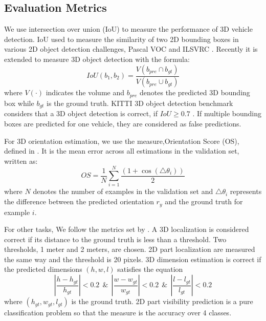 \subsection{Evaluation Metrics}

We use intersection over union (IoU) to measure the performance of 3D vehicle detection. IoU used to measure the similarity of two 2D bounding boxes in various 2D object detection challenges, \eg Pascal VOC \cite{Everingham15} and ILSVRC \cite{DBLP:Russakovsky14}. Recently it is extended to measure 3D object detection with the formula:
\begin{equation}
	IoU(b_1, b_2) = \frac{V(b_{pre}\cap b_{gt})}{V(b_{pre}\cup b_{gt})}
\end{equation}
where $V(\cdot)$ indicates the volume and $b_{pre}$ denotes the predicted 3D bounding box while $b_{gt}$ is the ground truth. KITTI 3D object detection benchmark considers that a 3D object detection is correct, if $IoU \geq 0.7$ \cite{Geiger2012CVPR}. If multiple bounding boxes are predicted for one vehicle, they are considered as false predictions. %

For 3D orientation estimation, we use the measure,Orientation Score (OS), defined in \cite{DBLP:journals/corr/MousavianAFK16}. It is the mean error across all estimations in the validation set, written as:
\begin{equation}
	OS =\frac{1}{N} \sum_{i=1}^N\frac{(1+\cos(\triangle \theta_i))}{2}
\end{equation}
where $N$ denotes the number of examples in the validation set and $\triangle \theta_i$ represents the difference between the predicted orientation $r_y$ and the ground truth for example $i$.

 For other tasks, We follow the metrics set by \cite{DBLP:journals/corr/ChabotCRTC17}. A 3D localization is considered correct if its distance to the ground truth is less than a threshold. Two thresholds, 1 meter and 2 meters, are chosen. 2D part localization are measured the same way and the threshold is 20 pixels. 3D dimension estimation is correct if the predicted dimensions $(h, w, l)$ satisfies the equation
\begin{equation}
	\left | \frac{h-h_{gt}}{h_{gt}} \right | < 0.2  ~~\&~~\left | \frac{w-w_{gt}}{w_{gt}} \right | < 0.2  ~~\&~~ \left | \frac{l-l_{gt}}{l_{gt}} \right | < 0.2
\end{equation}
where $(h_{gt}, w_{gt}, l_{gt})$ is the ground truth. 2D part visibility prediction is a pure classification problem so that the measure is the accuracy over 4 classes.

